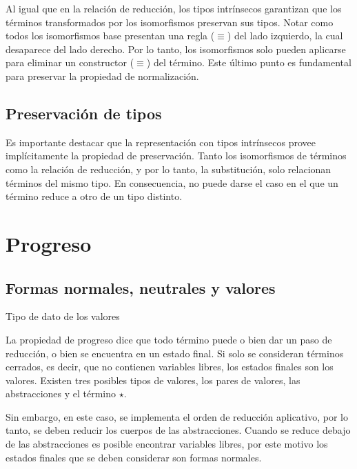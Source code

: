 \documentclass[]{report}
\begin{document}
	Al igual que en la relación de reducción, los tipos intrínsecos garantizan que los términos transformados por los isomorfismos preservan sus tipos.
	Notar como todos los isomorfismos base presentan una regla ($\equiv$) del lado izquierdo, la cual desaparece del lado derecho.
	Por lo tanto, los isomorfismos solo pueden aplicarse para eliminar un constructor ($\equiv$) del término.
	Este último punto es fundamental para preservar la propiedad de normalización.
	
	
	\subsection{Preservación de tipos}
	
	Es importante destacar que la representación con tipos intrínsecos provee implícitamente la propiedad de preservación.
	Tanto los isomorfismos de términos como la relación de reducción, y por lo tanto, la substitución, solo relacionan términos del mismo tipo.
	En consecuencia, no puede darse el caso en el que un término reduce a otro de un tipo distinto.
	

	\section{Progreso}
	
	\subsection{Formas normales, neutrales y valores}
	
	\begin{codigo}
		Tipo de dato de los valores
	\end{codigo}
	
	La propiedad de progreso dice que todo término puede o bien dar un paso de reducción, o bien se encuentra en un estado final.
	Si solo se consideran términos cerrados, es decir, que no contienen variables libres, los estados finales son los valores.
	Existen tres posibles tipos de valores, los pares de valores, las abstracciones y el término $\star$.
	
	Sin embargo, en este caso, se implementa el orden de reducción aplicativo, por lo tanto, se deben reducir los cuerpos de las abstracciones.
	Cuando se reduce debajo de las abstracciones es posible encontrar variables libres, por este motivo los estados finales que se deben considerar son formas normales.
	
\end{document}

